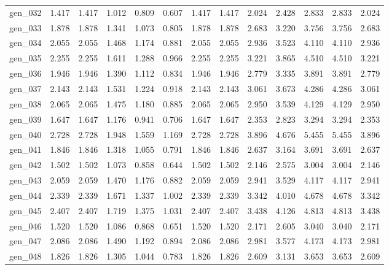 \begin{tabular}{lrrrrrrrrrrrr}
gen\_032 &  1.417 &  1.417 &  1.012 &  0.809 &  0.607 &  1.417 &  1.417 &  2.024 &  2.428 &  2.833 &  2.833 &  2.024 \\
gen\_033 &  1.878 &  1.878 &  1.341 &  1.073 &  0.805 &  1.878 &  1.878 &  2.683 &  3.220 &  3.756 &  3.756 &  2.683 \\
gen\_034 &  2.055 &  2.055 &  1.468 &  1.174 &  0.881 &  2.055 &  2.055 &  2.936 &  3.523 &  4.110 &  4.110 &  2.936 \\
gen\_035 &  2.255 &  2.255 &  1.611 &  1.288 &  0.966 &  2.255 &  2.255 &  3.221 &  3.865 &  4.510 &  4.510 &  3.221 \\
gen\_036 &  1.946 &  1.946 &  1.390 &  1.112 &  0.834 &  1.946 &  1.946 &  2.779 &  3.335 &  3.891 &  3.891 &  2.779 \\
gen\_037 &  2.143 &  2.143 &  1.531 &  1.224 &  0.918 &  2.143 &  2.143 &  3.061 &  3.673 &  4.286 &  4.286 &  3.061 \\
gen\_038 &  2.065 &  2.065 &  1.475 &  1.180 &  0.885 &  2.065 &  2.065 &  2.950 &  3.539 &  4.129 &  4.129 &  2.950 \\
gen\_039 &  1.647 &  1.647 &  1.176 &  0.941 &  0.706 &  1.647 &  1.647 &  2.353 &  2.823 &  3.294 &  3.294 &  2.353 \\
gen\_040 &  2.728 &  2.728 &  1.948 &  1.559 &  1.169 &  2.728 &  2.728 &  3.896 &  4.676 &  5.455 &  5.455 &  3.896 \\
gen\_041 &  1.846 &  1.846 &  1.318 &  1.055 &  0.791 &  1.846 &  1.846 &  2.637 &  3.164 &  3.691 &  3.691 &  2.637 \\
gen\_042 &  1.502 &  1.502 &  1.073 &  0.858 &  0.644 &  1.502 &  1.502 &  2.146 &  2.575 &  3.004 &  3.004 &  2.146 \\
gen\_043 &  2.059 &  2.059 &  1.470 &  1.176 &  0.882 &  2.059 &  2.059 &  2.941 &  3.529 &  4.117 &  4.117 &  2.941 \\
gen\_044 &  2.339 &  2.339 &  1.671 &  1.337 &  1.002 &  2.339 &  2.339 &  3.342 &  4.010 &  4.678 &  4.678 &  3.342 \\
gen\_045 &  2.407 &  2.407 &  1.719 &  1.375 &  1.031 &  2.407 &  2.407 &  3.438 &  4.126 &  4.813 &  4.813 &  3.438 \\
gen\_046 &  1.520 &  1.520 &  1.086 &  0.868 &  0.651 &  1.520 &  1.520 &  2.171 &  2.605 &  3.040 &  3.040 &  2.171 \\
gen\_047 &  2.086 &  2.086 &  1.490 &  1.192 &  0.894 &  2.086 &  2.086 &  2.981 &  3.577 &  4.173 &  4.173 &  2.981 \\
gen\_048 &  1.826 &  1.826 &  1.305 &  1.044 &  0.783 &  1.826 &  1.826 &  2.609 &  3.131 &  3.653 &  3.653 &  2.609 \\

\end{tabular}
